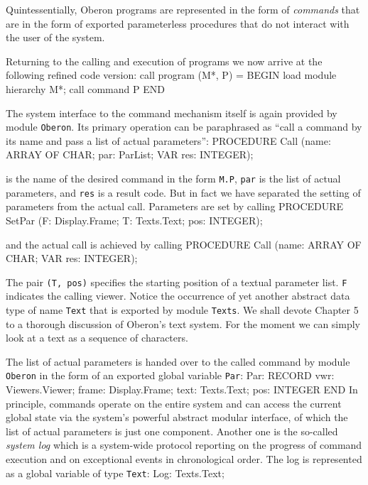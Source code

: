 Quintessentially, Oberon programs are represented in the form of
{\it commands\/} that are in the form of exported parameterless procedures
that do not interact with the user of the system.

Returning to the calling and execution of programs we now arrive at
the following refined code version:
\begintt
call program (M*, P) = BEGIN
  load module hierarchy M*; call command P
END
\endtt

\noindent The system interface to the command mechanism itself is again provided
by module {\tt Oberon\/}. Its primary operation can be paraphrased as
``call a command by its name and pass a list of actual parameters'':
\begintt
PROCEDURE Call (name: ARRAY OF CHAR; par: ParList;
                VAR res: INTEGER);
\endtt

 is the name of the desired command in the form {\tt M.P\/}, {\tt par\/} is the
list of actual parameters, and {\tt res\/} is a result code. But in fact we
have separated the setting of parameters from the actual
call. Parameters are set by calling
\begintt
PROCEDURE SetPar (F: Display.Frame; T: Texts.Text;
                  pos: INTEGER);
\endtt

\noindent and the actual call is achieved by calling
\begintt
PROCEDURE Call (name: ARRAY OF CHAR; VAR res: INTEGER);
\endtt

\noindent The pair {\tt (T, pos)\/} specifies the starting position of a textual
parameter list. {\tt F\/} indicates the calling viewer. Notice the occurrence
of yet another abstract data type of name {\tt Text\/} that is exported by
module {\tt Texts\/}. We shall devote Chapter 5 to a thorough discussion of
Oberon's text system. For the moment we can simply look at a text as a
sequence of characters.

The list of actual parameters is handed over to the called command by
module {\tt Oberon\/} in the form of an exported global variable {\tt Par\/}:
\begintt
Par: RECORD vwr: Viewers.Viewer;
       frame: Display.Frame;
       text: Texts.Text;
       pos: INTEGER
     END
\endtt
In principle, commands operate on the entire system and can access the
current global state via the system's powerful abstract modular
interface, of which the list of actual parameters is just one
component. Another one is the so-called {\it system log\/} which is a
system-wide protocol reporting on the progress of command execution
and on exceptional events in chronological order. The log is
represented as a global variable of type {\tt Text\/}:
\begintt
Log: Texts.Text;
\endtt

